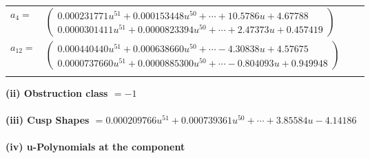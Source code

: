 \documentclass[1p]{elsarticle_modified}
\theoremstyle{definition}
\begin{document}
\begin{tabular}{m{7pt} m{180pt} m{7pt} m{180pt} }
\flushright $a_{4}=$&$\begin{pmatrix}0.000231771 u^{51}+0.000153448 u^{50}+\cdots+10.5786 u+4.67788\\0.0000301411 u^{51}+0.0000823394 u^{50}+\cdots+2.47373 u+0.457419\end{pmatrix}$ \\
\flushright $a_{12}=$&$\begin{pmatrix}0.000440440 u^{51}+0.000638660 u^{50}+\cdots-4.30838 u+4.57675\\0.0000737660 u^{51}+0.0000885300 u^{50}+\cdots-0.804093 u+0.949948\end{pmatrix}$\\&\end{tabular}
\flushleft \textbf{(ii) Obstruction class $= -1$}\\~\\
\flushleft \textbf{(iii) Cusp Shapes $= 0.000209766 u^{51}+0.000739361 u^{50}+\cdots+3.85584 u-4.14186$}\\~\\
\newpage\renewcommand{\arraystretch}{1}
\flushleft \textbf{(iv) u-Polynomials at the component}\newline \\
\end{document}
